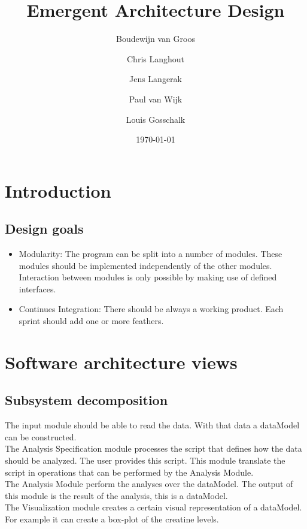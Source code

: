 \documentclass[a4paper]{article}
\title{Emergent Architecture Design}
\author[1]{Boudewijn van Groos}
\author[2]{Chris Langhout}
\author[3]{Jens Langerak}
\author[4]{Paul van Wijk}
\author[5]{Louis Gosschalk}
\affil[1]{bvangroos \\
4229843}
\affil[2]{clanghout \\
4281705}
\affil[3]{jlangerak \\
4317327}
\affil[4]{pjvanwijk \\
4285034}
\affil[5]{lgosschalk \\
4214528}
\date{\today}
\begin{document}
\maketitle
\tableofcontents
\newpage

\section{Introduction}
\subsection{Design goals}
 	\begin{itemize}
    \item Modularity:
    The program can be split into a number of modules. These modules should be implemented independently of the other modules. Interaction between modules is only possible by making use of defined interfaces.
    \item Continues Integration: There should be always a working product. Each sprint should add one or more feathers. 
		\end{itemize}

\section{Software architecture views}
\subsection{Subsystem decomposition}

The input module should be able to read the data. With that data a dataModel can be constructed. \\
The Analysis Specification module processes the script that defines how the data should be analyzed. The user provides this script. This module translate the script in operations that can be performed by the Analysis Module.\\
The Analysis Module perform the analyses over the dataModel. The output of this module is the result of the analysis, this is a dataModel.\\
The Visualization module creates a certain visual representation of a dataModel. For example it can create a box-plot of the creatine levels.
\end{document}
